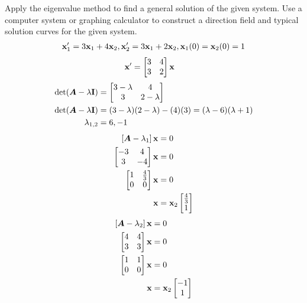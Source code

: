\documentclass{article}
\begin{document}
Apply the eigenvalue method to find a general solution of the given system. Use a computer system or graphing calculator to construct a direction field and typical solution curves for the given system.
\begin{align*}
	\vect{x}'_1 = 3\vect{x}_1 + 4\vect{x}_2, \vect{x}'_2 = 3\vect{x}_1 + 2\vect{x}_2, \vect{x}_1(0) = \vect{x}_2(0) = 1
\end{align*}
\begin{align*}
	\vect{x}' & =
		\begin{bmatrix}
			3 & 4 \\
			3 & 2
		\end{bmatrix} \vect{x}
\end{align*}
\begin{align*}
	\det( \matr{A} - \lambda \vect{I} ) & =
		\begin{bmatrix}
			3 - \lambda & 4 \\
			3 & 2 - \lambda
		\end{bmatrix} \\
	\det( \matr{A} - \lambda \vect{I} ) & =
		(3 - \lambda)(2 - \lambda) - (4)(3) = (\lambda - 6)(\lambda + 1) \\
	\lambda_{1,2} & = 6, -1
\end{align*}
\begin{align*}
	\left[ \matr{A} - \lambda_1 \right] \vect{x} & = 0 \\
	\begin{bmatrix}
		-3 & 4 \\
		3 & -4
	\end{bmatrix} \vect{x} & = 0 \\
	\begin{bmatrix}
		1 & \frac{4}{3} \\
		0 & 0
	\end{bmatrix} \vect{x} & = 0 \\
	\vect{x} & = \vect{x}_2 \begin{bmatrix} \frac{4}{3} \\ 1 \end{bmatrix}
\end{align*}
\begin{align*}
	\left[ \matr{A} - \lambda_2 \right] \vect{x} & = 0 \\
	\begin{bmatrix} 4 & 4 \\ 3 & 3 \end{bmatrix} \vect{x} & = 0 \\
	\begin{bmatrix} 1 & 1 \\ 0 & 0 \end{bmatrix} \vect{x} & = 0 \\
	\vect{x} & = \vect{x}_2 \begin{bmatrix} -1 \\ 1 \end{bmatrix}
\end{align*}
\end{document}
